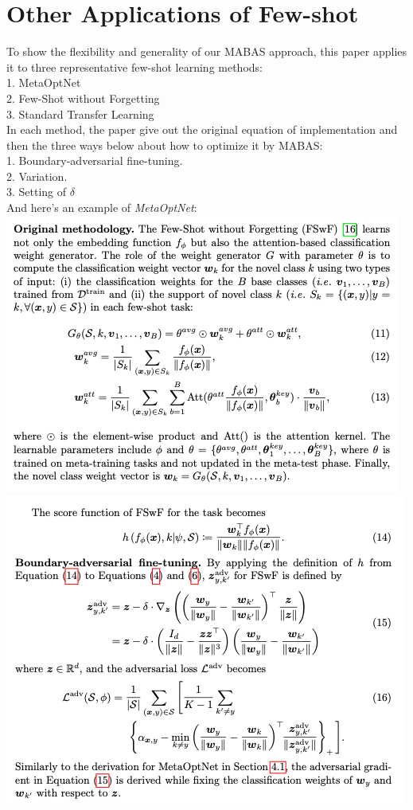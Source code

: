 \documentclass{article}
\begin{document}
\section{Other Applications of Few-shot}
To show the flexibility and generality of our MABAS approach, 
this paper applies it to three representative few-shot learning methods: \\
1. MetaOptNet \\
2. Few-Shot without Forgetting \\
3. Standard Transfer Learning \\

In each method, the paper give out the original equation of implementation 
and then the three ways below about how to optimize it by MABAS: \\
1. Boundary-adversarial fine-tuning. \\
2. Variation. \\
3. Setting of $\delta$ \\
And here's an example of \textit{MetaOptNet}: \\
\includegraphics[scale=0.6]{src/img/MetaOptNet1.jpg} \\
\includegraphics[scale=0.6]{src/img/MetaOptNet2.jpg} \\
\end{document}
